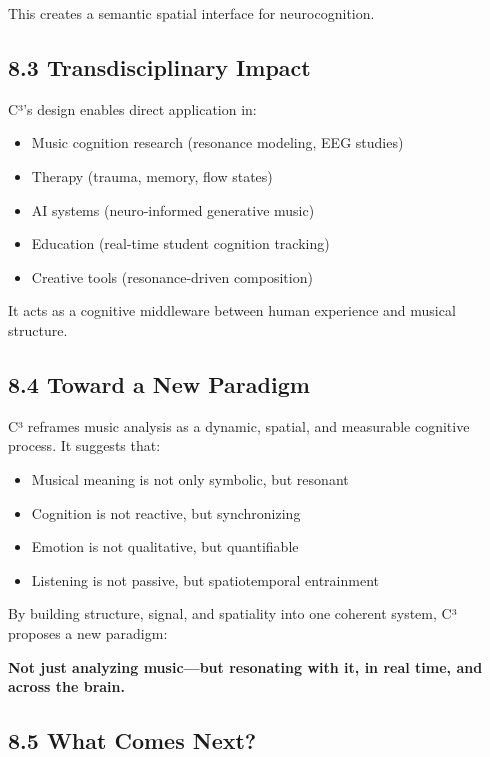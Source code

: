 \documentclass[10pt]{article}
\begin{document}
This creates a semantic spatial interface for neurocognition.

\subsection*{8.3 Transdisciplinary Impact}

C³’s design enables direct application in:

\begin{itemize}
    \item Music cognition research (resonance modeling, EEG studies)
    \item Therapy (trauma, memory, flow states)
    \item AI systems (neuro-informed generative music)
    \item Education (real-time student cognition tracking)
    \item Creative tools (resonance-driven composition)
\end{itemize}

It acts as a cognitive middleware between human experience and musical structure.

\subsection*{8.4 Toward a New Paradigm}

C³ reframes music analysis as a dynamic, spatial, and measurable cognitive process. It suggests that:

\begin{itemize}
    \item Musical meaning is not only symbolic, but resonant
    \item Cognition is not reactive, but synchronizing
    \item Emotion is not qualitative, but quantifiable
    \item Listening is not passive, but spatiotemporal entrainment
\end{itemize}

By building structure, signal, and spatiality into one coherent system, C³ proposes a new paradigm:

\textbf{Not just analyzing music—but resonating with it, in real time, and across the brain.}

\subsection*{8.5 What Comes Next?}
\end{document}
